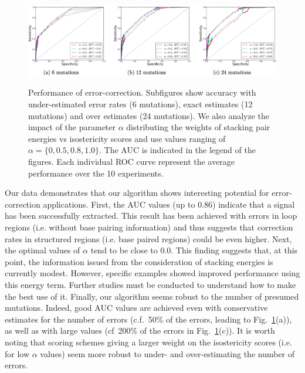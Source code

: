 \begin{figure}
\centering
	\includegraphics[width=\textwidth]{subfigs_perform.png}\\

\caption{Performance of error-correction. Subfigures show accuracy with under-estimated error rates (6 mutations), exact estimates (12 mutations) and over estimates 
(24 mutations). We also analyze the impact of the parameter $\alpha$ distributing the weights of stacking pair energies vs isostericity scores and use values 
ranging of $\alpha=\{0,0.5,0.8,1.0\}$. The AUC is indicated in the legend of the figures. Each individual ROC curve represent the average performance over the 10 experiments.}
\label{fig:ROCall}\SpaceCheating
\end{figure}

Our data demonstrates that our algorithm shows interesting potential for error-correction applications. First, the AUC values (up to $0.86$) indicate that a
signal has been successfully extracted. This result has been achieved with errors in loop regions (i.e. without base pairing information) and thus suggests
that correction rates in structured regions (i.e. base paired regions) could be even higher. Next, the optimal values of $\alpha$ tend to be close to $0.0$. This 
finding suggests that, at this point, the information issued from the consideration of stacking energies is currently modest. However, specific examples showed improved performance
using this energy term. Further studies must be conducted to understand how to make the best use of it. Finally, our algorithm seems robust to the number of
presumed mutations. Indeed, good AUC values are achieved even with conservative estimates for the number of errors (c.f.~50\% of the errors, leading to 
Fig.~\ref{fig:ROCall}(a)), as well as with large  values (cf~200\% of the errors  in Fig.~\ref{fig:ROCall}(c)). It is worth noting that scoring schemes giving a larger weight on
the isostericity scores (i.e. for low $\alpha$ values) seem more robust to under- and over-estimating the number of errors.

